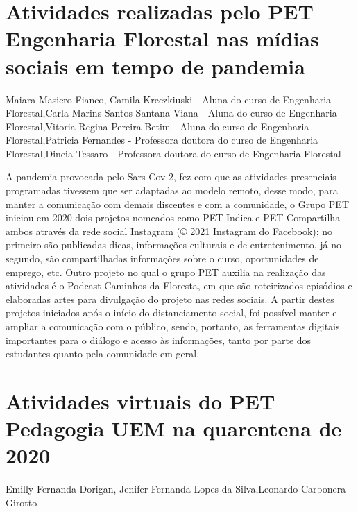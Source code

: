 

\section{Atividades realizadas pelo PET Engenharia Florestal nas mídias sociais em tempo de pandemia}

Maiara Masiero Fianco, Camila Kreczkiuski - Aluna do curso de Engenharia Florestal,Carla Marins Santos Santana Viana - Aluna do curso de Engenharia Florestal,Vitoria Regina Pereira Betim - Aluna do curso de Engenharia Florestal,Patricia Fernandes - Professora doutora do curso de Engenharia Florestal,Dineia Tessaro - Professora doutora do curso de Engenharia Florestal

A pandemia provocada pelo Sars-Cov-2, fez com que as atividades presenciais programadas tivessem que ser adaptadas ao modelo remoto, desse modo, para manter a comunicação com demais discentes e com a comunidade, o Grupo PET iniciou em 2020 dois projetos nomeados como PET Indica e PET Compartilha - ambos através da rede social Instagram (© 2021 Instagram do Facebook); no primeiro são publicadas dicas, informações culturais e de entretenimento, já no segundo, são compartilhadas informações sobre o curso, oportunidades de emprego, etc. Outro projeto no qual o grupo PET auxilia na realização das atividades é o Podcast Caminhos da Floresta, em que são roteirizados episódios e elaboradas artes para divulgação do projeto nas redes sociais. A partir destes projetos iniciados após o início do distanciamento social, foi possível manter e ampliar a comunicação com o público, sendo, portanto, as ferramentas digitais importantes para o diálogo e acesso às informações, tanto por parte dos estudantes quanto pela comunidade em geral.



\section{Atividades virtuais do PET Pedagogia UEM na quarentena de 2020}

Emilly Fernanda Dorigan, Jenifer Fernanda Lopes da Silva,Leonardo Carbonera Girotto

